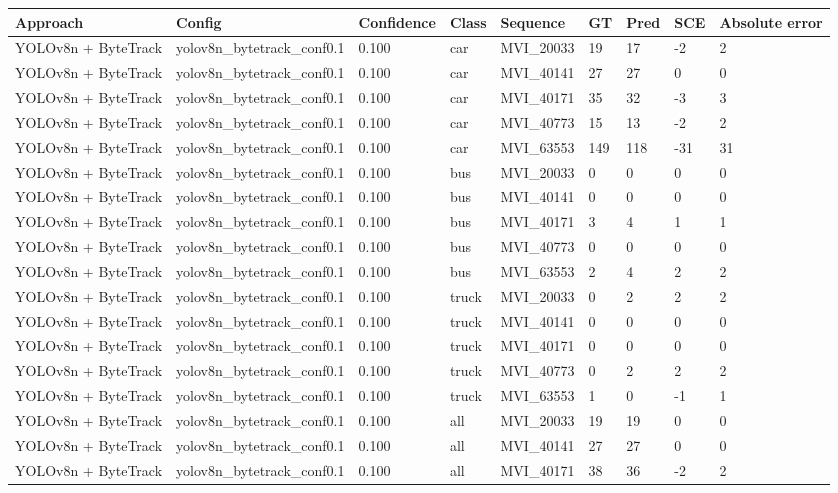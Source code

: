 \begin{tabular}{lllllllll}
\toprule
Approach & Config & Confidence & Class & Sequence & GT & Pred & SCE & Absolute error \\
\midrule
YOLOv8n + ByteTrack & yolov8n\_bytetrack\_conf0.1 & 0.100 & car & MVI\_20033 & 19 & 17 & -2 & 2 \\
YOLOv8n + ByteTrack & yolov8n\_bytetrack\_conf0.1 & 0.100 & car & MVI\_40141 & 27 & 27 & 0 & 0 \\
YOLOv8n + ByteTrack & yolov8n\_bytetrack\_conf0.1 & 0.100 & car & MVI\_40171 & 35 & 32 & -3 & 3 \\
YOLOv8n + ByteTrack & yolov8n\_bytetrack\_conf0.1 & 0.100 & car & MVI\_40773 & 15 & 13 & -2 & 2 \\
YOLOv8n + ByteTrack & yolov8n\_bytetrack\_conf0.1 & 0.100 & car & MVI\_63553 & 149 & 118 & -31 & 31 \\
YOLOv8n + ByteTrack & yolov8n\_bytetrack\_conf0.1 & 0.100 & bus & MVI\_20033 & 0 & 0 & 0 & 0 \\
YOLOv8n + ByteTrack & yolov8n\_bytetrack\_conf0.1 & 0.100 & bus & MVI\_40141 & 0 & 0 & 0 & 0 \\
YOLOv8n + ByteTrack & yolov8n\_bytetrack\_conf0.1 & 0.100 & bus & MVI\_40171 & 3 & 4 & 1 & 1 \\
YOLOv8n + ByteTrack & yolov8n\_bytetrack\_conf0.1 & 0.100 & bus & MVI\_40773 & 0 & 0 & 0 & 0 \\
YOLOv8n + ByteTrack & yolov8n\_bytetrack\_conf0.1 & 0.100 & bus & MVI\_63553 & 2 & 4 & 2 & 2 \\
YOLOv8n + ByteTrack & yolov8n\_bytetrack\_conf0.1 & 0.100 & truck & MVI\_20033 & 0 & 2 & 2 & 2 \\
YOLOv8n + ByteTrack & yolov8n\_bytetrack\_conf0.1 & 0.100 & truck & MVI\_40141 & 0 & 0 & 0 & 0 \\
YOLOv8n + ByteTrack & yolov8n\_bytetrack\_conf0.1 & 0.100 & truck & MVI\_40171 & 0 & 0 & 0 & 0 \\
YOLOv8n + ByteTrack & yolov8n\_bytetrack\_conf0.1 & 0.100 & truck & MVI\_40773 & 0 & 2 & 2 & 2 \\
YOLOv8n + ByteTrack & yolov8n\_bytetrack\_conf0.1 & 0.100 & truck & MVI\_63553 & 1 & 0 & -1 & 1 \\
YOLOv8n + ByteTrack & yolov8n\_bytetrack\_conf0.1 & 0.100 & all & MVI\_20033 & 19 & 19 & 0 & 0 \\
YOLOv8n + ByteTrack & yolov8n\_bytetrack\_conf0.1 & 0.100 & all & MVI\_40141 & 27 & 27 & 0 & 0 \\
YOLOv8n + ByteTrack & yolov8n\_bytetrack\_conf0.1 & 0.100 & all & MVI\_40171 & 38 & 36 & -2 & 2 \\

\end{tabular}
